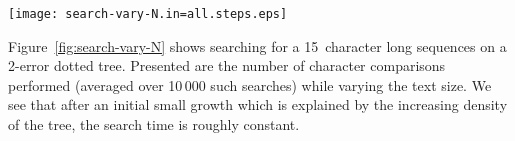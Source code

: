 \begin{figure*}
\centering
\texttt{[image: search-vary-N.in=all.steps.eps]}
\caption{Search time versus text size}\label{fig:search-vary-N}
\end{figure*}


Figure~\ref{fig:search-vary-N} shows searching for a 15~character long sequences on a 2-error dotted tree. Presented are the number of character comparisons performed (averaged over 10\,000 such searches) while varying the text size. We see that after an initial small growth which is explained by the increasing density of the tree, the search time is roughly constant.
